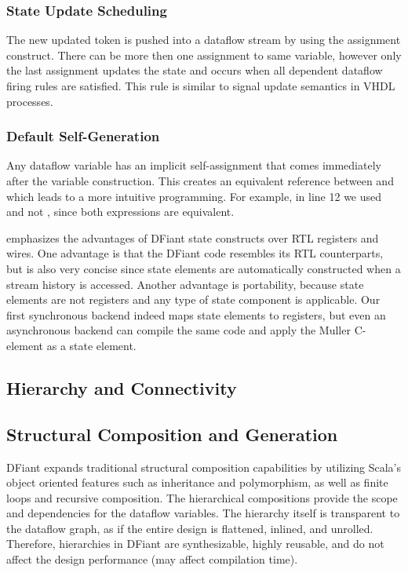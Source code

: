 \subsubsection{State Update Scheduling} The new updated token is pushed into a dataflow stream by using the \code{:=} assignment construct. There can be more then one assignment to same variable, however only the last assignment updates the state and occurs when all dependent dataflow firing rules are satisfied. This rule is similar to signal update semantics in VHDL processes.

\subsubsection{Default Self-Generation} Any dataflow  variable has an implicit self-assignment  that comes immediately after the variable construction. This creates an equivalent reference between  and  which leads to a more intuitive programming.
For example, in line 12 we used  and not , since both expressions are equivalent.

\vspace{2ex}

 emphasizes the advantages of DFiant state constructs over RTL registers and wires.
One advantage is that the DFiant code resembles its RTL counterparts, but is also very concise since state elements are automatically constructed when a stream history is accessed. Another advantage is portability, because state elements are not registers and any type of state component is applicable. Our first synchronous backend indeed maps state elements to registers, but even an asynchronous backend can compile the same code and apply the Muller C-element\cite{muller1957theory} as a state element. 


\subsection{Hierarchy and Connectivity}


\subsection{Structural Composition and Generation}
DFiant expands traditional structural composition capabilities by utilizing Scala's object oriented features such as inheritance and polymorphism, as well as finite loops and recursive composition. The hierarchical compositions provide the scope and dependencies for the dataflow variables. The hierarchy itself is transparent to the dataflow graph, as if the entire design is flattened, inlined, and unrolled. Therefore, hierarchies in DFiant are synthesizable, highly reusable, and do not affect the design performance (may affect compilation time). 

